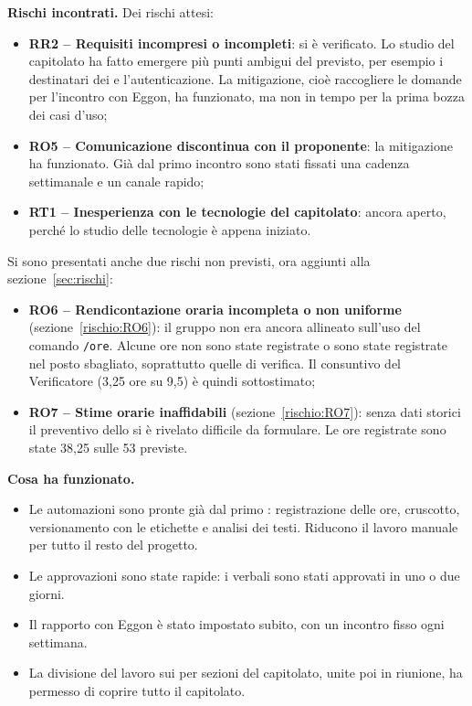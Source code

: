 \documentclass[documento]{gpt}
\begin{document}
\textbf{Rischi incontrati.} Dei rischi attesi:
\begin{itemize}
  \item \textbf{RR2 -- Requisiti incompresi o incompleti}: si è verificato.
        Lo studio del capitolato ha fatto emergere più punti ambigui del
        previsto, per esempio i destinatari dei 
        e l'autenticazione. La mitigazione, cioè raccogliere le domande per
        l'incontro con Eggon, ha funzionato, ma non in tempo per la prima
        bozza dei casi d'uso;
  \item \textbf{RO5 -- Comunicazione discontinua con il proponente}: la
        mitigazione ha funzionato. Già dal primo incontro sono stati fissati
        una cadenza settimanale e un canale rapido;
  \item \textbf{RT1 -- Inesperienza con le tecnologie del capitolato}:
        ancora aperto, perché lo studio delle tecnologie è appena iniziato.
\end{itemize}
Si sono presentati anche due rischi non previsti, ora aggiunti alla
sezione~\ref{sec:rischi}:
\begin{itemize}
  \item \textbf{RO6 -- Rendicontazione oraria incompleta o non uniforme}
        (sezione~\ref{rischio:RO6}): il gruppo non era ancora allineato
        sull'uso del comando \texttt{/ore}. Alcune ore non sono state
        registrate o sono state registrate nel posto sbagliato, soprattutto
        quelle di verifica. Il consuntivo del Verificatore (3,25 ore su 9,5)
        è quindi sottostimato;
  \item \textbf{RO7 -- Stime orarie inaffidabili}
        (sezione~\ref{rischio:RO7}): senza dati storici il preventivo dello
         si è rivelato difficile da formulare.
        Le ore registrate sono state 38,25 sulle 53 previste.
\end{itemize}

\clearpage

\textbf{Cosa ha funzionato.}
\begin{itemize}
  \item Le automazioni sono pronte già dal primo
        : registrazione delle ore, cruscotto,
        versionamento con le etichette e analisi dei testi. Riducono il
        lavoro manuale per tutto il resto del progetto.
  \item Le approvazioni sono state rapide: i verbali sono stati approvati
        in uno o due giorni.
  \item Il rapporto con Eggon è stato impostato subito, con un incontro
        fisso ogni settimana.
  \item La divisione del lavoro sui  per sezioni
        del capitolato, unite poi in riunione, ha permesso di coprire tutto
        il capitolato.
\end{itemize}
\end{document}

